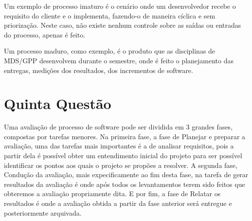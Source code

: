 Um exemplo de processo imaturo é o cenário onde um desenvolvedor recebe o requisito
do cliente e o implementa, fazendo-o de maneira cíclica e sem priorização.
Neste caso, não existe nenhum controle sobre as saídas ou entradas do processo,
apenas é feito.

Um processo maduro, como exemplo, é o produto que as disciplinas de MDS/GPP
desenvolvem durante o semestre, onde é feito o planejamento das entregas, medições
dos resultados, dos incrementos de software.

\section{Quinta Questão}
\label{sec:Quinta Questão}

Uma avaliação de processo de software pode ser dividida em 3 grandes fases, compostas por tarefas menores.
Na primeira fase, a fase de Planejar e preparar a avaliação, uma das tarefas mais importantes é a de analisar requisitos,
pois a partir dela é possível obter um entendimento inicial do projeto para ser possível identificar os pontos aos quais
o projeto se propões a resolver.
A segunda fase, Condução da avaliação, mais expecificamente ao fim desta fase, na tarefa de gerar resultados da avaliação é
onde após todos os levantamentos terem sido feitos que obteremos a avaliação propriamente dita.
E por fim, a fase de Relatar os resultados é onde a avaliação obtida a partir da fase anterior será entregue e posteriormente arquivada.
